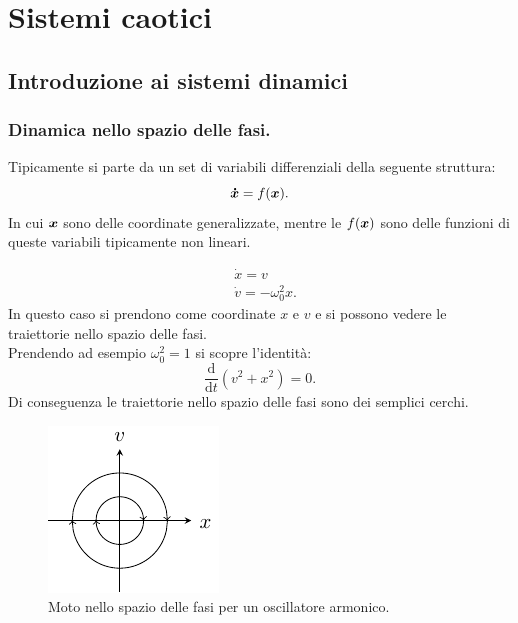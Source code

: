 \setcounter{Sec}{\value{section}} %
\chapter{Sistemi caotici}
\setcounter{section}{\value{Sec}} %

\section{Introduzione ai sistemi dinamici}%
\label{sub:Lezione 15}
\mylocaltoc
\subsection{Dinamica nello spazio delle fasi.}%
\label{sub:Dinamica nello spazio delle fasi.}
Tipicamente si parte da un set di variabili differenziali della seguente struttura:
\[
    \boldsymbol{\dot{x}} = f(\boldsymbol{x}) 
.\] 
In cui $\boldsymbol{x}$  sono delle coordinate generalizzate, mentre le $f(\boldsymbol{x})$  sono delle funzioni di queste variabili tipicamente non lineari.
\begin{exmp}
    \[\begin{aligned}
	& \dot{x}=v\\
	& \dot{v} = -\omega_0^2x
    .\end{aligned}\]
    In questo caso si prendono come coordinate $x$  e $v$  e si possono vedere le traiettorie nello spazio delle fasi.\\
    Prendendo ad esempio $\omega_0^2 = 1$  si scopre l'identità:
    \[
	\frac{\text{d} }{\text{d} t} (v^2+x^2) = 0
    .\] 
    Di conseguenza le traiettorie nello spazio delle fasi sono dei semplici cerchi.
    \begin{figure}[H]
        \centering
        \includegraphics[width=0.8\columnwidth]{lezioni/tikz/lez_15_osc_armonico.pdf}
        \caption{\scriptsize Moto nello spazio delle fasi per un oscillatore armonico.}
        \label{fig:osc_armonico}
    \end{figure}
\end{exmp}
